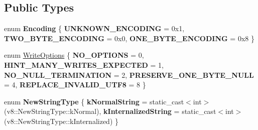 \subsection*{Public Types}
\begin{DoxyCompactItemize}
\item 
\mbox{\label{classv8_1_1String_a2f4a2e9516c246eef602b889ce049c49}} 
enum {\bfseries Encoding} \{ {\bfseries U\+N\+K\+N\+O\+W\+N\+\_\+\+E\+N\+C\+O\+D\+I\+NG} = 0x1, 
{\bfseries T\+W\+O\+\_\+\+B\+Y\+T\+E\+\_\+\+E\+N\+C\+O\+D\+I\+NG} = 0x0, 
{\bfseries O\+N\+E\+\_\+\+B\+Y\+T\+E\+\_\+\+E\+N\+C\+O\+D\+I\+NG} = 0x8
 \}
\item 
enum \mbox{\hyperlink{classv8_1_1String_a9ce7f1458ffd08f8eb2b9c8dc056e616}{Write\+Options}} \{ \newline
{\bfseries N\+O\+\_\+\+O\+P\+T\+I\+O\+NS} = 0, 
{\bfseries H\+I\+N\+T\+\_\+\+M\+A\+N\+Y\+\_\+\+W\+R\+I\+T\+E\+S\+\_\+\+E\+X\+P\+E\+C\+T\+ED} = 1, 
{\bfseries N\+O\+\_\+\+N\+U\+L\+L\+\_\+\+T\+E\+R\+M\+I\+N\+A\+T\+I\+ON} = 2, 
{\bfseries P\+R\+E\+S\+E\+R\+V\+E\+\_\+\+O\+N\+E\+\_\+\+B\+Y\+T\+E\+\_\+\+N\+U\+LL} = 4, 
\newline
{\bfseries R\+E\+P\+L\+A\+C\+E\+\_\+\+I\+N\+V\+A\+L\+I\+D\+\_\+\+U\+T\+F8} = 8
 \}
\item 
\mbox{\label{classv8_1_1String_a37620fb9fdc9b72ec9eea2a2aafaddee}} 
enum {\bfseries New\+String\+Type} \{ {\bfseries k\+Normal\+String} = static\+\_\+cast$<$int$>$(v8\+:\+:New\+String\+Type\+:\+:k\+Normal), 
{\bfseries k\+Internalized\+String} = static\+\_\+cast$<$int$>$(v8\+:\+:New\+String\+Type\+:\+:k\+Internalized)
 \}
\end{DoxyCompactItemize}
